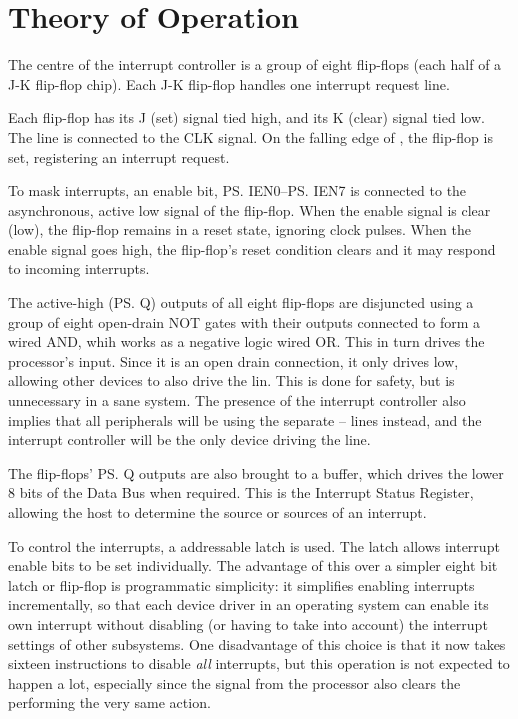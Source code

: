 \section{Theory of Operation}

The centre of the interrupt controller is a group of eight flip-flops (each
half of a  J-K flip-flop chip). Each J-K flip-flop handles one
interrupt request line.

Each flip-flop has its J (set) signal tied high, and its K (clear) signal tied
low. The  line is connected to the CLK signal. On the falling edge of
, the flip-flop is set, registering an interrupt request.

To mask interrupts, an enable bit, \ps{IEN0}–\ps{IEN7} is connected to the
asynchronous, active low  signal of the flip-flop. When the enable
signal is clear (low), the flip-flop remains in a reset state, ignoring clock
pulses. When the enable signal goes high, the flip-flop's reset condition
clears and it may respond to incoming interrupts.

The active-high (\ps{Q}) outputs of all eight flip-flops are disjuncted using a
group of eight open-drain NOT gates with their outputs connected to form a
wired AND, whih works as a negative logic wired OR. This in turn drives the
processor's  input. Since it is an open drain connection, it only
drives low, allowing other devices to also drive the  lin. This is done
for safety, but is unnecessary in a sane system. The presence of the interrupt
controller also implies that all peripherals will be using the separate
– lines instead, and the interrupt controller will be the
only device driving the  line.

The flip-flops' \ps{Q} outputs are also brought to a  buffer, which
drives the lower 8 bits of the Data Bus when required. This is the Interrupt
Status Register, allowing the host to determine the source or sources of an
interrupt.

To control the interrupts, a  addressable latch is used. The latch
allows interrupt enable bits to be set individually. The advantage of this over
a simpler eight bit latch or flip-flop is programmatic simplicity: it
simplifies enabling interrupts incrementally, so that each device driver in an
operating system can enable its own interrupt without disabling (or having to
take into account) the interrupt settings of other subsystems. One disadvantage
of this choice is that it now takes sixteen instructions to disable {\em all\/}
interrupts, but this operation is not expected to happen a lot, especially
since the  signal from the processor also clears the 
performing the very same action.

